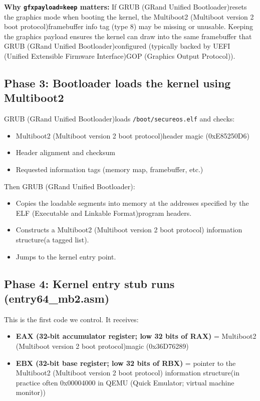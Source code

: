 \documentclass[11pt]{article}
\newcommand{\EAXreg}{EAX (32-bit accumulator register; low 32 bits of RAX)}
\newcommand{\EBXreg}{EBX (32-bit base register; low 32 bits of RBX)}
\newcommand{\ELF}{ELF (Executable and Linkable Format)}
\newcommand{\GOP}{GOP (Graphics Output Protocol)}
\newcommand{\GRUB}{GRUB (GRand Unified Bootloader)}
\newcommand{\MBtwo}{Multiboot2 (Multiboot version 2 boot protocol)}
\newcommand{\MBtwoInfo}{Multiboot2 (Multiboot version 2 boot protocol) information structure}
\newcommand{\QEMU}{QEMU (Quick Emulator; virtual machine monitor)}
\newcommand{\UEFI}{UEFI (Unified Extensible Firmware Interface)}
\begin{document}
\textbf{Why \texttt{gfxpayload=keep} matters:}
If \GRUB resets the graphics mode when booting the kernel, the \MBtwo framebuffer info tag (type 8) may be missing or unusable. Keeping the graphics payload ensures the kernel can draw into the same framebuffer that \GRUB configured (typically backed by \UEFI \GOP).

\subsection{Phase 3: Bootloader loads the kernel using Multiboot2}
\GRUB loads \texttt{/boot/secureos.elf} and checks:
\begin{itemize}
  \item \MBtwo header magic (0xE85250D6)
  \item Header alignment and checksum
  \item Requested information tags (memory map, framebuffer, etc.)
\end{itemize}

Then \GRUB:
\begin{itemize}
  \item Copies the loadable segments into memory at the addresses specified by the \ELF program headers.
  \item Constructs a \MBtwoInfo (a tagged list).
  \item Jumps to the kernel entry point.
\end{itemize}

\subsection{Phase 4: Kernel entry stub runs (entry64\_mb2.asm)}
This is the first code we control. It receives:
\begin{itemize}
  \item \textbf{\EAXreg} = \MBtwo magic (0x36D76289)
  \item \textbf{\EBXreg} = pointer to the \MBtwoInfo (in practice often 0x00004000 in \QEMU)
\end{itemize}
\end{document}
